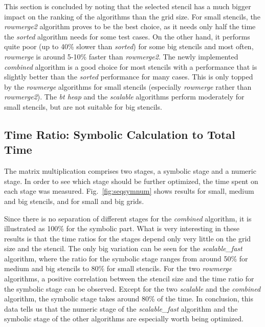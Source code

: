 This section is concluded by noting that the selected stencil has a much bigger impact on the ranking of the algorithms than the grid size. For small stencils, the \textit{rowmerge2} algorithm proves to be the best choice, as it needs only half the time the \textit{sorted} algorithm needs for some test cases. On the other hand, it performs quite poor (up to 40\% slower than \textit{sorted}) for some big stencils and most often, \textit{rowmerge} is around 5-10\% faster than \textit{rowmerge2}. The newly implemented \textit{combined} algorithm is a good choice for most stencils with a performance that is slightly better than the \textit{sorted} performance for many cases. This is only topped by the \textit{rowmerge} algorithms for small stencils (especially \textit{rowmerge} rather than \textit{rowmerge2}). The \textit{bt heap} and the \textit{scalable} algorithms perform moderately for small stencils, but are not suitable for big stencils.

\subsection{Time Ratio: Symbolic Calculation to Total Time}
The matrix multiplication comprises two stages, a symbolic stage and a numeric stage. In order to see which stage should be further optimized, the time spent on each stage was measured. Fig.~\ref{fig:seqsymnum} shows results for small, medium and big stencils, and for small and big grids. 

Since there is no separation of different stages for the \textit{combined} algorithm, it is illustrated as 100\% for the symbolic part. What is very interesting in these results is that the time ratios for the stages depend only very little on the grid size and the stencil. The only big variation can be seen for the \textit{scalable\_fast} algorithm, where the ratio for the symbolic stage ranges from around 50\% for medium and big stencils to 80\% for small stencils. For the two \textit{rowmerge} algorithms, a positive correlation between the stencil size and the time ratio for the symbolic stage can be observed. Except for the two \textit{scalable} and the \textit{combined} algorithm, the symbolic stage takes around 80\% of the time. In conclusion, this data tells us that the numeric stage of the \textit{scalable\_fast} algorithm and the symbolic stage of the other algorithms are especially worth being optimized.

